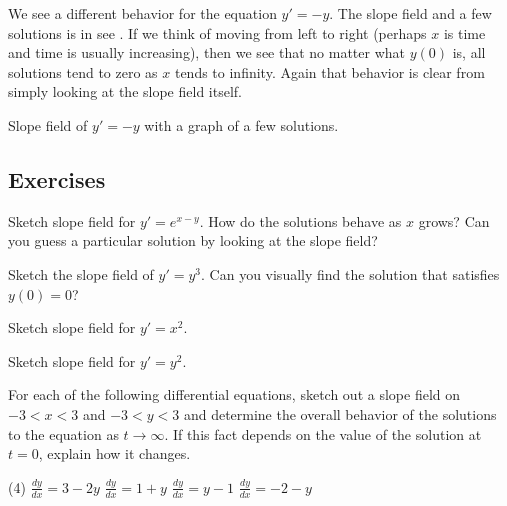 We see a different behavior for the equation
$y' = -y$.  The slope field and a few solutions is in
see .
If we think of moving from left to right (perhaps $x$ is time
and time is usually increasing), then
we see that no matter what $y(0)$ is, all solutions tend to zero as $x$
tends to infinity.
Again that behavior is clear from simply
looking at the slope field itself.

\begin{myfig}
\capstart
{}
\caption{Slope field of $y' = -y$ with a graph of a few solutions.\label{1.3:fig3}}
\end{myfig}

\subsection{Exercises}

\begin{exercise}
Sketch slope field for $y'=e^{x-y}$.  How do the solutions behave as $x$
grows?  Can you guess a particular solution by looking at the slope
field?
\end{exercise}

\begin{exercise}\ansMark%
Sketch the slope field of $y'=y^3$.  Can you visually find the solution
that satisfies $y(0)=0$?
\end{exercise}


\begin{exercise}
Sketch slope field for $y'=x^2$.
\end{exercise}

\begin{exercise}
Sketch slope field for $y'=y^2$.
\end{exercise}

\begin{exercise}
For each of the following differential equations, sketch out a slope field on $-3 < x < 3$ and $-3 < y < 3$ and determine the overall behavior of the solutions to the equation as $t \rightarrow \infty$. If this fact depends on the value of the solution at $t=0$, explain how it changes.
\begin{tasks}(4)
\task $\displaystyle \frac{dy}{dx} = 3 - 2y$
\task $\displaystyle \frac{dy}{dx} = 1 + y$
\task $\displaystyle \frac{dy}{dx} = y - 1$
\task $\displaystyle \frac{dy}{dx} = -2 - y$
\end{tasks}
\end{exercise}

